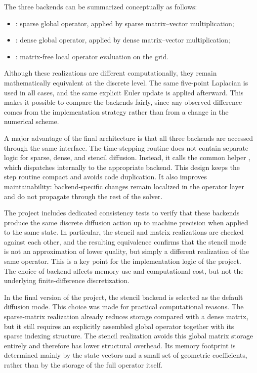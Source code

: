 The three backends can be summarized conceptually as follows:
\begin{itemize}
    \item {}: sparse global operator, applied by sparse matrix--vector multiplication;
    \item {}: dense global operator, applied by dense matrix--vector multiplication;
    \item {}: matrix-free local operator evaluation on the grid.
\end{itemize}
Although these realizations are different computationally, they remain mathematically equivalent at the discrete level. The same five-point Laplacian is used in all cases, and the same explicit Euler update is applied afterward. This makes it possible to compare the backends fairly, since any observed difference comes from the implementation strategy rather than from a change in the numerical scheme.

A major advantage of the final architecture is that all three backends are accessed through the same interface. The time-stepping routine  does not contain separate logic for sparse, dense, and stencil diffusion. Instead, it calls the common helper , which dispatches internally to the appropriate backend. This design keeps the step routine compact and avoids code duplication. It also improves maintainability: backend-specific changes remain localized in the operator layer and do not propagate through the rest of the solver.

The project includes dedicated consistency tests to verify that these backends produce the same discrete diffusion action up to machine precision when applied to the same state. In particular, the stencil and matrix realizations are checked against each other, and the resulting equivalence confirms that the stencil mode is not an approximation of lower quality, but simply a different realization of the same operator. This is a key point for the implementation logic of the project. The choice of backend affects memory use and computational cost, but not the underlying finite-difference discretization.

In the final version of the project, the stencil backend is selected as the default diffusion mode. This choice was made for practical computational reasons. The sparse-matrix realization already reduces storage compared with a dense matrix, but it still requires an explicitly assembled global operator together with its sparse indexing structure. The stencil realization avoids this global matrix storage entirely and therefore has lower structural overhead. Its memory footprint is determined mainly by the state vectors and a small set of geometric coefficients, rather than by the storage of the full operator itself.

